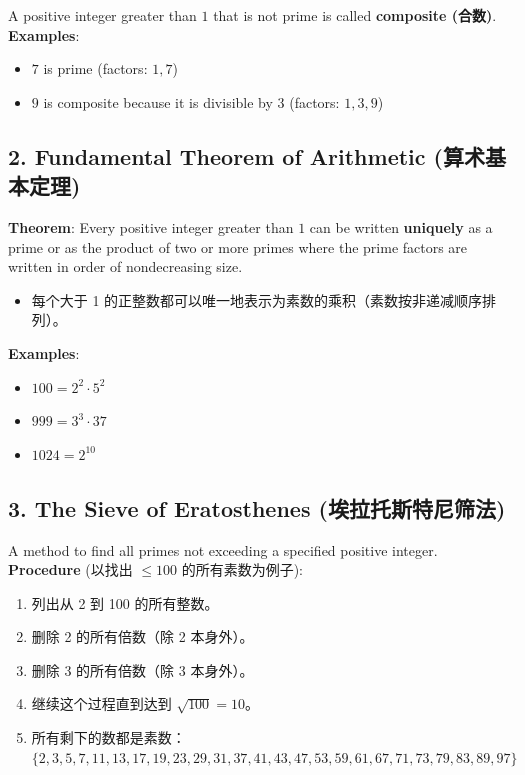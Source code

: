 \documentclass[10pt,a4paper,openany]{ctexbook}
\theoremstyle{definition}
\theoremstyle{remark}
\begin{document}
A positive integer greater than $1$ that is not prime is called \textbf{composite (合数)}.
\textbf{Examples}:
\begin{itemize}
\item $7$ is prime (factors: $1, 7$)
\item $9$ is composite because it is divisible by $3$ (factors: $1, 3, 9$)

\end{itemize}

\vspace{-2pt}

\subsection{2. Fundamental Theorem of Arithmetic (算术基本定理)}

\textbf{Theorem}: Every positive integer greater than $1$ can be written \textbf{uniquely} as a prime or as the product of two or more primes where the prime factors are written in order of nondecreasing size.
\begin{itemize}
\item 每个大于 1 的正整数都可以唯一地表示为素数的乘积（素数按非递减顺序排列）。

\end{itemize}

\textbf{Examples}:
\begin{itemize}
\item $100 = 2^2 \cdot 5^2$
\item $999 = 3^3 \cdot 37$
\item $1024 = 2^{10}$

\end{itemize}

\vspace{-2pt}

\subsection{3. The Sieve of Eratosthenes (埃拉托斯特尼筛法)}

A method to find all primes not exceeding a specified positive integer.
\textbf{Procedure} (以找出 $\leq 100$ 的所有素数为例子):
\begin{enumerate}
\item 列出从 2 到 100 的所有整数。
\item 删除 2 的所有倍数（除 2 本身外）。
\item 删除 3 的所有倍数（除 3 本身外）。
\item 继续这个过程直到达到 $\sqrt{100} = 10$。
\item 所有剩下的数都是素数：$\{2, 3, 5, 7, 11, 13, 17, 19, 23, 29, 31, 37, 41, 43, 47, 53, 59, 61, 67, 71, 73, 79, 83, 89, 97\}$

\end{enumerate}
\end{document}
